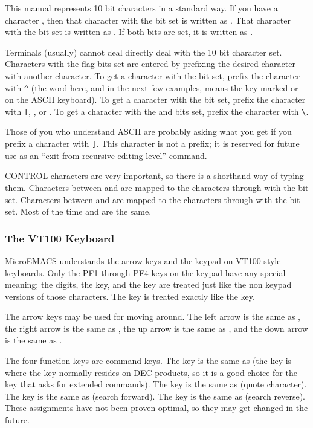 This manual represents 10 bit characters in a standard way. If you
have a character , then that character with
the \CONTROL{} bit set is
written as . That character with the
\META{} bit set is written as .
If both bits are set, it is written as .

Terminals (usually) cannot deal directly deal with the 10 bit
character set.
Characters with the flag bits set are entered by prefixing the
desired character with another character.
To get a character with the \CONTROL{} bit set,
prefix the character with \verb+^+ (the
word  here, and in the next few examples, means the key marked
 or  on the ASCII keyboard).
To get a character with the
\META{} bit set, prefix the character
with \verb+[+, , or .
To get a character with the \CONTROL{}
and \META{} bits set, prefix the character
with \verb+\+.

Those of you who understand ASCII are probably asking what you get
if you prefix a character with \verb+]+.
This character is not a prefix;
it is reserved for future use as an ``exit from recursive editing level''
command.

CONTROL characters are very important, so there is a shorthand way
of typing them.
Characters between  and  are mapped
to the characters  through  with the \CONTROL{} bit set.
Characters between
 and  are mapped to
the characters  through 
with the \CONTROL{} bit set.
Most of the time  and  are the same.
\subsubsection{The VT100 Keyboard}
MicroEMACS understands the arrow keys and the keypad on VT100
style keyboards. Only the PF1 through PF4 keys on the keypad have any
special meaning; the digits,
the \Text{-} key, and the \Text{,} key are treated just
like the non keypad versions of those characters.
The  key is treated
exactly like the  key.

The arrow keys may be used for moving around. The left arrow is the
same as  ,
the right arrow is the same as , the up arrow is the same
as , and the down arrow is the same as .

The four function keys are command keys.
The  key is the same as 
(the  key is where the  key normally
resides on DEC products, so
it is a good choice for the key that asks for extended commands).
The  key is the same as  (quote character).
The  key is the same as  (search forward).
The  key is the same as  (search reverse). 
These assignments have not been proven optimal, so they may get changed
in the future.
